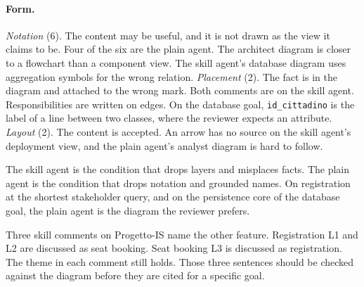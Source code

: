 \documentclass[11pt]{article}
\begin{document}
\paragraph{Form.}
\textit{Notation} (6). The content may be useful, and it is not drawn as the view it claims to be. Four of the six are the plain agent. The architect diagram is closer to a flowchart than a component view. The skill agent's database diagram uses aggregation symbols for the wrong relation.
\textit{Placement} (2). The fact is in the diagram and attached to the wrong mark. Both comments are on the skill agent. Responsibilities are written on edges. On the database goal, \texttt{id\_cittadino} is the label of a line between two classes, where the reviewer expects an attribute.
\textit{Layout} (2). The content is accepted. An arrow has no source on the skill agent's deployment view, and the plain agent's analyst diagram is hard to follow.

The skill agent is the condition that drops layers and misplaces facts. The plain agent is the condition that drops notation and grounded names. On registration at the shortest stakeholder query, and on the persistence core of the database goal, the plain agent is the diagram the reviewer prefers.

Three skill comments on Progetto-IS name the other feature. Registration L1 and L2 are discussed as seat booking. Seat booking L3 is discussed as registration. The theme in each comment still holds. Those three sentences should be checked against the diagram before they are cited for a specific goal.
\end{document}
